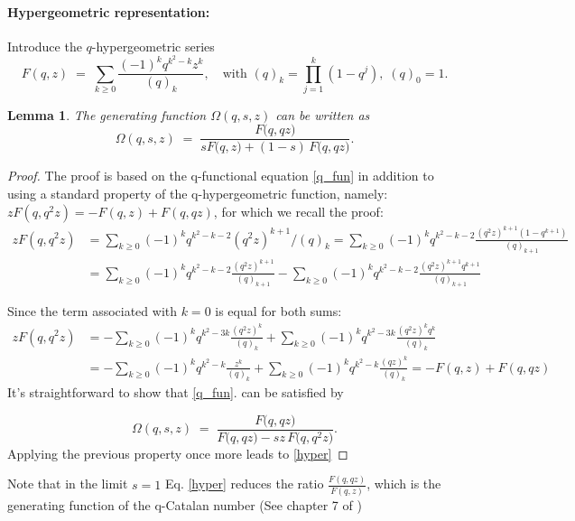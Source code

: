 \documentclass[pdflatex,sn-mathphys-num]{sn-jnl}
\newtheorem{lemma}[theorem]{Lemma}
\theoremstyle{definition}
\theoremstyle{remark}
\numberwithin{equation}{section}
\begin{document}
\paragraph*{Hypergeometric representation:}
Introduce the \(q\)-hypergeometric series
\begin{equation}
      F(q,z)\;=\;\sum_{k\ge 0}\frac{(-1)^{k}q^{k^{2}-k}z^{k}}{(q)_{k}},
  \quad\text{with }(q)_{k}=\prod_{j=1}^{k}(1-q^{j}),\;(q)_{0}=1 .
  \label{F}
\end{equation}
\begin{lemma}\label{Ram}
The generating function \(\Omega(q,s,z)\) can be written as
\begin{equation}\label{hyper}
  \Omega(q,s,z)\;=\;
  \frac{F\!\bigl(q,q z\bigr)}
       {s F\!\bigl(q,z\bigr)+(1-s)\,F\!\bigl(q,q z\bigr)}.
\end{equation}
\end{lemma}
\begin{proof}
The proof is based on the q-functional equation \ref{q_fun} in addition to using a standard property of the q-hypergeometric function, namely: $z F(q, q^2 z) = - F(q,z) + F(q,q z) $, for which we recall the proof:
\begin{align}
        z F(q, q^2 z) &= \sum_{k \geq 0} (-1)^k q^{k^2 - k -2} (q^2 z)^{k+1} /(q)_{k} = \sum_{k \geq 0} (-1)^k q^{k^2 - k -2}
    \frac{(q^2 z)^{k+1} (1-q^{k+1})}{(q)_{k+1}} \\
   &= \sum_{k \geq 0} (-1)^k q^{k^2 - k -2}
    \frac{(q^2 z)^{k+1} }{(q)_{k+1}}
    -
 \sum_{k \geq 0} (-1)^k q^{k^2 - k -2}
    \frac{(q^2 z)^{k+1} q^{k+1}} {(q)_{k+1}}
\end{align}

Since the term associated with $k=0$ is equal for both sums:
\begin{align}
        z F(q, q^2 z) &= -\sum_{k \geq 0} (-1)^k q^{k^2 - 3 k}
    \frac{(q^2 z)^{k} }{(q)_{k}}
    +
 \sum_{k \geq 0} (-1)^k q^{k^2 - 3 k}
    \frac{(q^2 z)^{k} q^{k}} {(q)_{k}} \\
 &= -\sum_{k \geq 0} (-1)^k q^{k^2 -  k}
    \frac{z^{k} }{(q)_{k}}
    +
 \sum_{k \geq 0} (-1)^k q^{k^2 -  k}
    \frac{(q z)^{k}} {(q)_{k}} =
     -
    F(q,z)
    +
 F(q,q z) 
\end{align}
It's straightforward to show that \ref{q_fun}.
can be satisfied by 

\begin{equation}
  \Omega(q,s,z)\;=\;
  \frac{F\!\bigl(q,qz\bigr)}
       {F\!\bigl(q,qz\bigr)-sz\,F\!\bigl(q,q^2 z\bigr)}.
\end{equation}
Applying the previous property once more leads to  \ref{hyper} 
\end{proof}
Note that in the limit $s=1$ Eq. \ref{hyper} reduces the ratio $\frac{F(q,qz)}{F(q,z)}$, which is the generating  function of the q-Catalan number (See chapter 7 of \cite{andrews1998theory})
\end{document}
